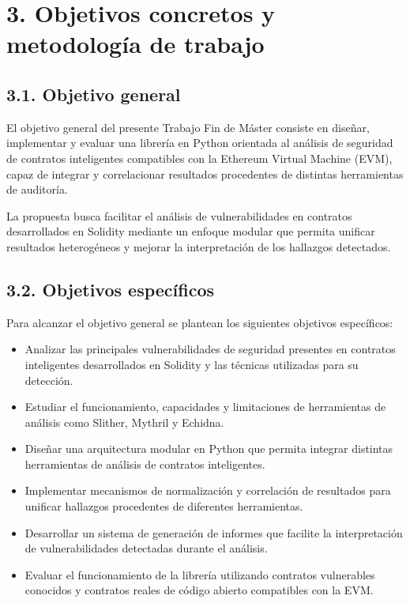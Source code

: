 \section{3. Objetivos concretos y metodología de
trabajo}\label{objetivos-concretos-y-metodologuxeda-de-trabajo}

\subsection{3.1. Objetivo general}\label{objetivo-general}

El objetivo general del presente Trabajo Fin de Máster consiste en
diseñar, implementar y evaluar una librería en Python orientada al
análisis de seguridad de contratos inteligentes compatibles con la
Ethereum Virtual Machine (EVM), capaz de integrar y correlacionar
resultados procedentes de distintas herramientas de auditoría.

La propuesta busca facilitar el análisis de vulnerabilidades en
contratos desarrollados en Solidity mediante un enfoque modular que
permita unificar resultados heterogéneos y mejorar la interpretación de
los hallazgos detectados.

\subsection{3.2. Objetivos específicos}\label{objetivos-especuxedficos}

Para alcanzar el objetivo general se plantean los siguientes objetivos
específicos:

\begin{itemize}
\tightlist
\item
  Analizar las principales vulnerabilidades de seguridad presentes en
  contratos inteligentes desarrollados en Solidity y las técnicas
  utilizadas para su detección.
\item
  Estudiar el funcionamiento, capacidades y limitaciones de herramientas
  de análisis como Slither, Mythril y Echidna.
\item
  Diseñar una arquitectura modular en Python que permita integrar
  distintas herramientas de análisis de contratos inteligentes.
\item
  Implementar mecanismos de normalización y correlación de resultados
  para unificar hallazgos procedentes de diferentes herramientas.
\item
  Desarrollar un sistema de generación de informes que facilite la
  interpretación de vulnerabilidades detectadas durante el análisis.
\item
  Evaluar el funcionamiento de la librería utilizando contratos
  vulnerables conocidos y contratos reales de código abierto compatibles
  con la EVM.
\end{itemize}

